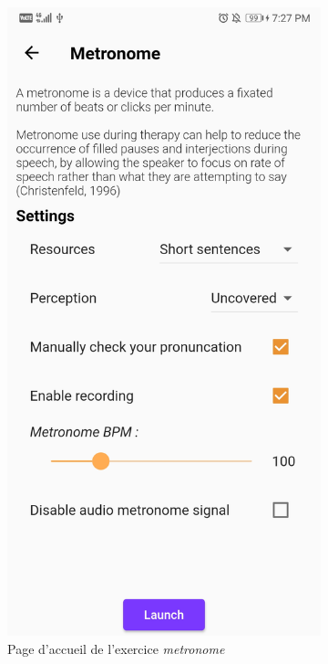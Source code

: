 \begin{appendices}
\begin{landscape}
\begin{figure}[h]
\begin{subfigure}{.25\textwidth}
    \includegraphics[width=.75\linewidth]{content/imgs/screen3.jpg}
    \caption{Page d'accueil de l'exercice \textit{metronome}}
    \label{appendix:screen_metronome}
  \end{subfigure}%
  \begin{subfigure}{.25\textwidth}
    \centering

\end{subfigure}
\end{figure}
\end{landscape}
\end{appendices}
